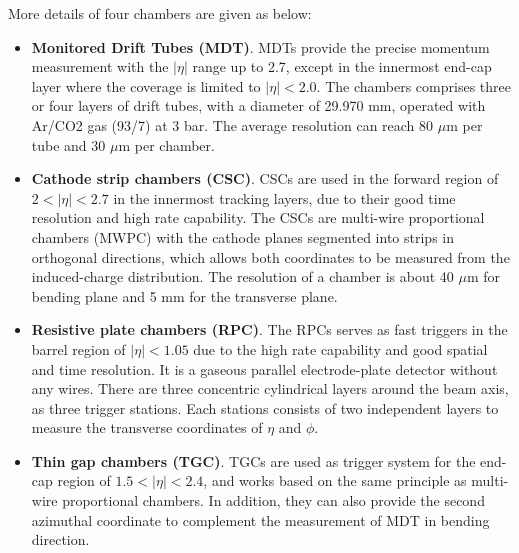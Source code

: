 More details of four chambers are given as below:
\begin{itemize}
	\item \textbf{Monitored Drift Tubes (MDT)}. MDTs provide the precise momentum measurement with the $|\eta|$ range up to 2.7, except in the innermost end-cap layer where the coverage is limited to $|\eta| < 2.0$. The chambers comprises three or four layers of drift tubes, with a diameter of 29.970 mm, operated with Ar/CO2 gas (93/7) at 3 bar. The average resolution can reach 80 $\mu$m per tube and 30 $\mu$m per chamber.
	\item \textbf{Cathode strip chambers (CSC)}. CSCs are used in the forward region of $2 < |\eta| < 2.7$ in the innermost tracking layers, due to their good time resolution and high rate capability. The CSCs are multi-wire proportional chambers (MWPC) with the cathode planes segmented into strips in orthogonal directions, which allows both coordinates to be measured from the induced-charge distribution. The resolution of a chamber is about 40 $\mu$m for bending plane and 5 mm for the transverse plane.
	\item \textbf{Resistive plate chambers (RPC)}. The RPCs serves as fast triggers in the barrel region of $|\eta| < 1.05$ due to the high rate capability and good spatial and time resolution. It is a gaseous parallel electrode-plate detector without any wires. There are three concentric cylindrical layers around the beam axis, as three trigger stations. Each stations consists of two independent layers to measure the transverse coordinates of $\eta$ and $\phi$.
	\item \textbf{Thin gap chambers (TGC)}. TGCs are used as trigger system for the end-cap region of $1.5 < |\eta| < 2.4$, and works based on the same principle as multi-wire proportional chambers. In addition, they can also provide the second azimuthal coordinate to complement the measurement of MDT in bending direction.
\end{itemize}
